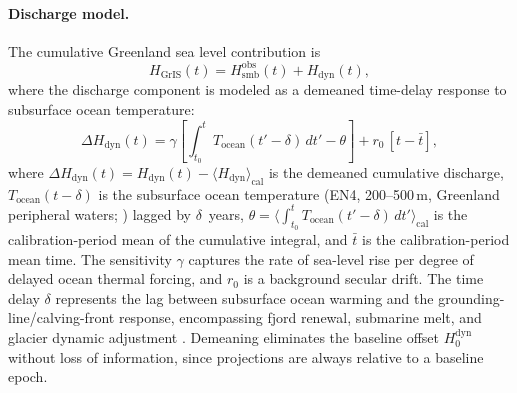\documentclass[11pt]{article}
\begin{document}
\paragraph{Discharge model.}
The cumulative Greenland sea level contribution is
\begin{equation}
	H_{\mathrm{GrIS}}(t) = H_{\mathrm{smb}}^{\mathrm{obs}}(t) + H_{\mathrm{dyn}}(t),
	\label{eq:greenland_total}
\end{equation}
where the discharge component is modeled as a demeaned time-delay response to subsurface ocean temperature:
\begin{equation}
	\Delta H_{\mathrm{dyn}}(t) = \gamma \left[\int_{t_0}^{t} T_{\mathrm{ocean}}(t' - \delta)\, dt' - \theta\right] + r_0\, [t - \bar{t}],
	\label{eq:greenland_dyn}
\end{equation}
where $\Delta H_{\mathrm{dyn}}(t) = H_{\mathrm{dyn}}(t) - \langle H_{\mathrm{dyn}} \rangle_{\mathrm{cal}}$ is the demeaned cumulative discharge, $T_{\mathrm{ocean}}(t - \delta)$ is the subsurface ocean temperature (EN4, 200--500\,m, Greenland peripheral waters; \citealp{Good2013}) lagged by $\delta$~years, $\theta = \langle \int_{t_0}^{t} T_{\mathrm{ocean}}(t' - \delta)\, dt' \rangle_{\mathrm{cal}}$ is the calibration-period mean of the cumulative integral, and $\bar{t}$ is the calibration-period mean time. The sensitivity $\gamma$ captures the rate of sea-level rise per degree of delayed ocean thermal forcing, and $r_0$ is a background secular drift. The time delay $\delta$ represents the lag between subsurface ocean warming and the grounding-line/calving-front response, encompassing fjord renewal, submarine melt, and glacier dynamic adjustment \citep{Straneo2015, Felikson2017}. Demeaning eliminates the baseline offset $H_0^{\mathrm{dyn}}$ without loss of information, since projections are always relative to a baseline epoch.
\end{document}
